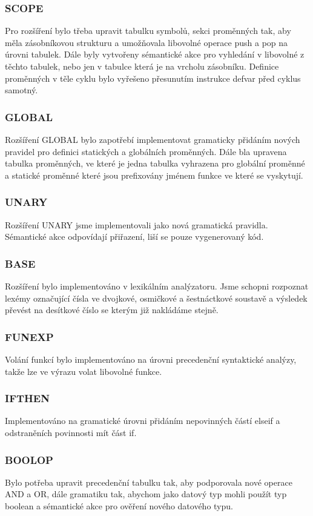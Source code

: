 \subsubsection{SCOPE}
Pro rozšíření bylo třeba upravit tabulku symbolů, sekci proměnných tak, aby
měla zásobníkovou strukturu a umožňovala libovolné operace push a pop na úrovni tabulek.
Dále byly vytvořeny sémantické akce pro vyhledání v libovolné z těchto tabulek,
nebo jen v tabulce která je na vrcholu zásobníku. Definice proměnných v těle cyklu
bylo vyřešeno přesunutím instrukce defvar před cyklus samotný.
\subsubsection{GLOBAL}
Rozšíření GLOBAL bylo zapotřebí implementovat gramaticky přidáním
nových pravidel pro definici statických a globálních proměnných.
Dále bla upravena tabulka proměnných, ve které je jedna tabulka vyhrazena
pro globální proměnné a statické proměnné které jsou prefixovány
jménem funkce ve které se vyskytují.
\subsubsection{UNARY}
Rozšíření UNARY jsme implementovali jako nová gramatická pravidla. Sémantické
akce odpovídají přiřazení, liší se pouze vygenerovaný kód.
\subsubsection{BASE}
Rozšíření bylo implementováno v lexikálním analýzatoru. Jsme schopni rozpoznat
lexémy označující čísla ve dvojkové, osmičkové a šestnáctkové soustavě a
výsledek převést na desítkové číslo se kterým již nakládáme stejně.
\subsubsection{FUNEXP}
Volání funkcí bylo implementováno na úrovni precedenční syntaktické analýzy,
takže lze ve výrazu volat libovolné funkce.
\subsubsection{IFTHEN}
Implementováno na gramatické úrovni přidáním nepovinných částí
elseif a odstraněních povinnosti mít část if.
\subsubsection{BOOLOP}
Bylo potřeba upravit precedenční tabulku tak, aby podporovala nové
operace AND a OR, dále gramatiku tak, abychom jako datový typ mohli
použít typ boolean a sémantické akce pro ověření nového datového typu.
